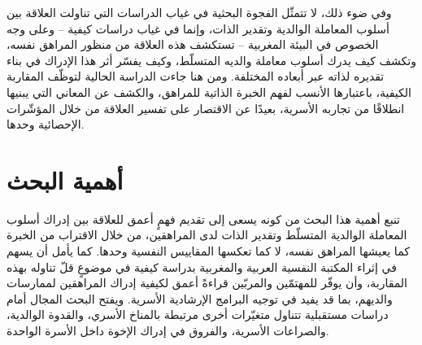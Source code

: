 وفي ضوء ذلك، لا تتمثّل الفجوة البحثية في غياب الدراسات التي تناولت العلاقة بين أسلوب المعاملة
الوالدية وتقدير الذات، وإنما في غياب دراسات كيفية -- وعلى وجه الخصوص في البيئة المغربية -- تستكشف
هذه العلاقة من منظور المراهق نفسه، وتكشف كيف يدرك أسلوب معاملة والديه المتسلّط، وكيف يفسّر أثر
هذا الإدراك في بناء تقديره لذاته عبر أبعاده المختلفة. ومن هنا جاءت الدراسة الحالية لتوظّف المقاربة
الكيفية، باعتبارها الأنسب لفهم الخبرة الذاتية للمراهق، والكشف عن المعاني التي يبنيها انطلاقًا من تجاربه
الأسرية، بعيدًا عن الاقتصار على تفسير العلاقة من خلال المؤشّرات الإحصائية وحدها.

\section{أهمية البحث}
تنبع أهمية هذا البحث من كونه يسعى إلى تقديم فهمٍ أعمق للعلاقة بين إدراك أسلوب المعاملة الوالدية
المتسلّط وتقدير الذات لدى المراهقين، من خلال الاقتراب من الخبرة كما يعيشها المراهق نفسه، لا كما
تعكسها المقاييس النفسية وحدها. كما يأمل أن يسهم في إثراء المكتبة النفسية العربية والمغربية بدراسة كيفية
في موضوعٍ قلّ تناوله بهذه المقاربة، وأن يوفّر للمهتمّين والمربّين قراءةً أعمق لكيفية إدراك المراهقين
لممارسات والديهم، بما قد يفيد في توجيه البرامج الإرشادية الأسرية. ويفتح البحث المجال أمام دراسات
مستقبلية تتناول متغيّرات أخرى مرتبطة بالمناخ الأسري، والقدوة الوالدية، والصراعات الأسرية، والفروق في
إدراك الإخوة داخل الأسرة الواحدة.
